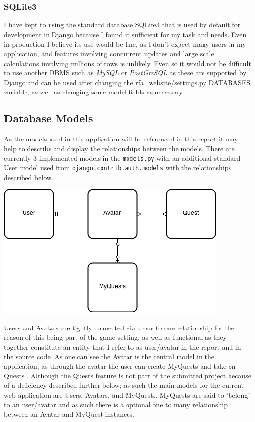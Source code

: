 \documentclass[11pt,a4paper]{article}
\begin{document}
\subsubsection{SQLite3}
I have kept to using the standard database SQLite3 that is used by default for development in Django because I found it sufficient for my task and needs. Even in production I believe its use would be fine, as I don't expect many users in my application, and features involving concurrent updates and large scale calculations involving millions of rows is unlikely. Even so it would not be difficult to use another DBMS such as \textit{MySQL} or \textit{PostGreSQL} as these are supported by Django and can be used after changing the rfa\_website/settings.py DATABASES variable, as well as changing some model fields as necessary.

\subsection{Database Models}
As the models used in this application will be referenced in this report it may help to describe and display the relationships between the models. There are currently 3 implemented models in the \verb|models.py| with an additional standard User model used from \verb|django.contrib.auth.models| with the relationships described below.

\begin{center}
\includegraphics[scale=0.5]{selpModels.png} \\
\end{center}

Users and Avatars are tightly connected via a one to one relationship for the reason of this being part of the game setting, as well as functional as they together constitute an entity that I refer to as user/avatar in the report and in the source code. As one can see the Avatar is the central model in the application; as through the avatar the user can create MyQuests and take on Quests . Although the Quests feature is not part of the submitted project because of a deficiency described further below; as such the main models for the current web application are Users, Avatars, and MyQuests. MyQuests are said to 'belong' to an user/avatar and as such there is a optional one to many relationship between an Avatar and MyQuest instances.
\end{document}
